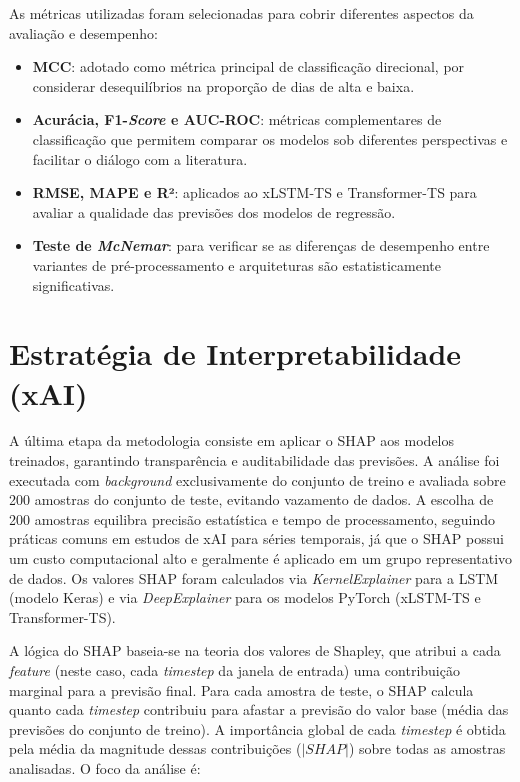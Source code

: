 As métricas utilizadas foram selecionadas para cobrir diferentes aspectos da avaliação e desempenho:

\begin{itemize}
    \item \textbf{MCC}: adotado como métrica principal de classificação direcional, por considerar desequilíbrios na proporção de dias de alta e baixa.
    \item \textbf{Acurácia, F1-\textit{Score} e AUC-ROC}: métricas complementares de classificação que permitem comparar os modelos sob diferentes perspectivas e facilitar o diálogo com a literatura.
    \item \textbf{RMSE, MAPE e {R}²}: aplicados ao xLSTM-TS e Transformer-TS para avaliar a qualidade das previsões dos modelos de regressão.
    \item \textbf{Teste de \textit{McNemar}}: para verificar se as diferenças de desempenho entre variantes de pré-processamento e arquiteturas são estatisticamente significativas.
\end{itemize}

\section{Estratégia de Interpretabilidade (xAI)}

A última etapa da metodologia consiste em aplicar o SHAP aos modelos treinados, garantindo transparência e auditabilidade das previsões. A análise foi executada com \textit{background} exclusivamente do conjunto de treino e avaliada sobre 200 amostras do conjunto de teste, evitando vazamento de dados. A escolha de 200 amostras equilibra precisão estatística e tempo de processamento, seguindo práticas comuns em estudos de xAI para séries temporais, já que o SHAP possui um custo computacional alto e geralmente é aplicado em um grupo representativo de dados. Os valores SHAP foram calculados via \textit{KernelExplainer} para a LSTM (modelo Keras) e via \textit{DeepExplainer} para os modelos PyTorch (xLSTM-TS e Transformer-TS). 

A lógica do SHAP baseia-se na teoria dos valores de Shapley, que atribui a cada \textit{feature} (neste caso, cada \textit{timestep} da janela de entrada) uma contribuição marginal para a previsão final. Para cada amostra de teste, o SHAP calcula quanto cada \textit{timestep} contribuiu para afastar a previsão do valor base (média das previsões do conjunto de treino). A importância global de cada \textit{timestep} é obtida pela média da magnitude dessas contribuições ($|SHAP|$) sobre todas as amostras analisadas. O foco da análise é:

